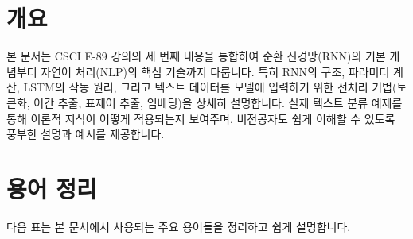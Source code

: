 \documentclass[11pt,a4paper]{article}
\begin{document}
\newpage
\section*{개요}
본 문서는 CSCI E-89 강의의 세 번째 내용을 통합하여 순환 신경망(RNN)의 기본 개념부터 자연어 처리(NLP)의 핵심 기술까지 다룹니다. 특히 RNN의 구조, 파라미터 계산, LSTM의 작동 원리, 그리고 텍스트 데이터를 모델에 입력하기 위한 전처리 기법(토큰화, 어간 추출, 표제어 추출, 임베딩)을 상세히 설명합니다. 실제 텍스트 분류 예제를 통해 이론적 지식이 어떻게 적용되는지 보여주며, 비전공자도 쉽게 이해할 수 있도록 풍부한 설명과 예시를 제공합니다.

\newpage
\section*{용어 정리}
다음 표는 본 문서에서 사용되는 주요 용어들을 정리하고 쉽게 설명합니다.
\end{document}
